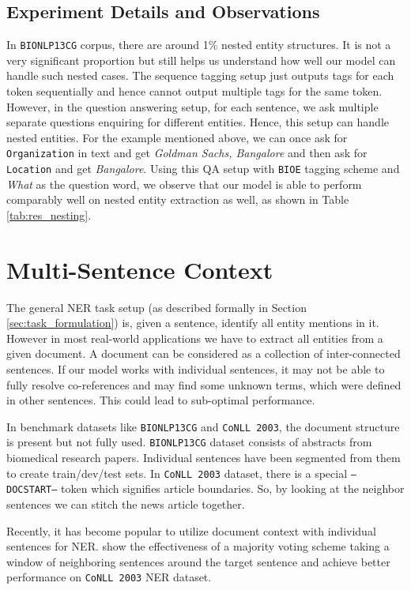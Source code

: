 \subsection{Experiment Details and Observations}

In \texttt{BIONLP13CG} corpus, there are around 1\% nested entity structures. It is not a very significant proportion but still helps us understand how well our model can handle such nested cases. The sequence tagging setup just outputs tags for each token sequentially and hence cannot output multiple tags for the same token. However, in the question answering setup, for each sentence, we ask multiple separate questions enquiring for different entities. Hence, this setup can handle nested entities. For the example mentioned above, we can once ask for \texttt{Organization} in text and get \textit{Goldman Sachs, Bangalore} and then ask for \texttt{Location} and get \textit{Bangalore}. Using this QA setup with \texttt{BIOE} tagging scheme and \textit{What} as the question word, we observe that our model is able to perform comparably well on nested entity extraction as well, as shown in Table \ref{tab:res_nesting}.

\section{Multi-Sentence Context}
The general NER task setup (as described formally in Section \ref{sec:task_formulation}) is, given a sentence, identify all entity mentions in it. However in most real-world applications we have to extract all entities from a given document. A document can be considered as a collection of inter-connected sentences. If our model works with individual sentences, it may not be able to fully resolve co-references and may find some unknown terms, which were defined in other sentences. This could lead to sub-optimal performance. 

In benchmark datasets like \texttt{BIONLP13CG} and \texttt{CoNLL 2003}, the document structure is present but not fully used. \texttt{BIONLP13CG} dataset consists of abstracts from biomedical research papers. Individual sentences have been segmented from them to create train/dev/test sets. In \texttt{CoNLL 2003} dataset, there is a special \texttt{--DOCSTART--} token which signifies article boundaries. So, by looking at the neighbor sentences we can stitch the news article together. 

Recently, it has become popular to utilize document context with individual sentences for NER\cite{devlin2018bert, yamada2020luke}. \cite{luoma2020exploring} show the effectiveness of a majority voting scheme taking a window of neighboring sentences around the target sentence and achieve better performance on \texttt{CoNLL 2003} NER dataset. 

